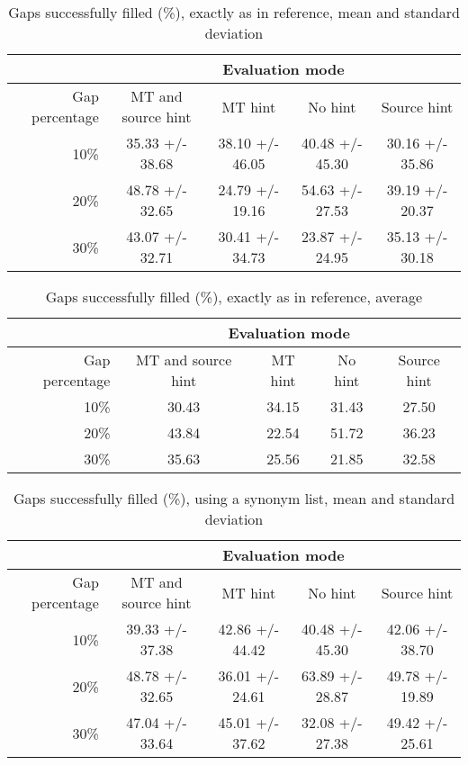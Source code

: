 \documentclass[11pt, oneside]{article}   	%
\begin{document}

\begin{table}
\centering
\begin{tabular}{|r |*{4}{c}|}
\hline
 &\multicolumn{4}{c|}{Evaluation mode}\\
\hline
Gap percentage & MT and source hint & MT hint & No hint & Source hint\\
\hline
10\%&35.33 +/- 38.68&38.10 +/- 46.05&40.48 +/- 45.30&30.16 +/- 35.86\\
20\%&48.78 +/- 32.65&24.79 +/- 19.16&54.63 +/- 27.53&39.19 +/- 20.37\\
30\%&43.07 +/- 32.71&30.41 +/- 34.73&23.87 +/- 24.95&35.13 +/- 30.18\\
\hline
\end{tabular}
\caption {Gaps successfully filled (\%), exactly as in reference, mean and standard deviation} \label{tab:title} 
\end{table}

\begin{table}
\centering
\begin{tabular}{|r |*{4}{c}|}
\hline
 &\multicolumn{4}{c|}{Evaluation mode}\\
\hline
Gap percentage & MT and source hint & MT hint & No hint & Source hint\\
\hline
10\%&30.43&34.15&31.43&27.50\\
20\%&43.84&22.54&51.72&36.23\\
30\%&35.63&25.56&21.85&32.58\\
\hline
\end{tabular}
\caption {Gaps successfully filled (\%), exactly as in reference, average} \label{tab:title} 
\end{table}

\begin{table}
\centering
\begin{tabular}{|r |*{4}{c}|}
\hline
 &\multicolumn{4}{c|}{Evaluation mode}\\
\hline
Gap percentage & MT and source hint & MT hint & No hint & Source hint\\
\hline
10\%&39.33 +/- 37.38&42.86 +/- 44.42&40.48 +/- 45.30&42.06 +/- 38.70\\
20\%&48.78 +/- 32.65&36.01 +/- 24.61&63.89 +/- 28.87&49.78 +/- 19.89\\
30\%&47.04 +/- 33.64&45.01 +/- 37.62&32.08 +/- 27.38&49.42 +/- 25.61\\
\hline
\end{tabular}
\caption {Gaps successfully filled (\%), using a synonym list, mean and standard deviation} \label{tab:title} 
\end{table}
\end{document}
